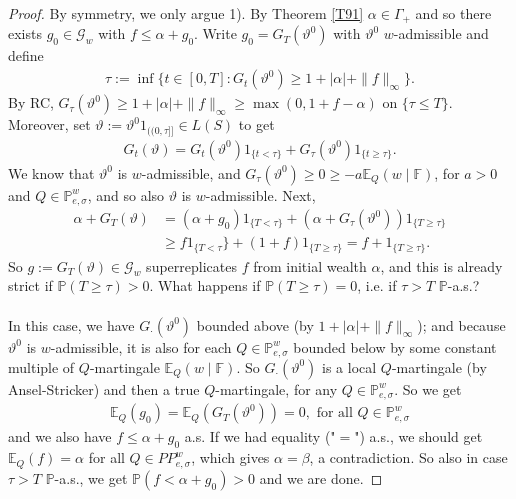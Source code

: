 \documentclass[12pt,a4paper, twoside]{article}
\theoremstyle{definition}
\newcommand{\EE}{\mathbb{E}} %
\newcommand{\PP}{\mathbb{P}} %
\begin{document}
\begin{proof}
By symmetry, we only argue 1). By Theorem \ref{T91} $\alpha \in \Gamma_+$ and so there exists $g_0 \in \mathcal{G}_w$ with $f \leq \alpha + g_0$. Write $g_0 = G_T( \vartheta^0)$ with $\vartheta^0$ $w$-admissible and define \begin{align*}
\tau := \inf \{ t \in [0,T]: G_t( \vartheta^0) \geq 1 + | \alpha | + \|f\|_\infty \}. 
\end{align*}
By RC, $G_\tau ( \vartheta^0) \geq 1 + | \alpha| + \|f\|_\infty \geq \max(0, 1 + f- \alpha)$ on $\{ \tau \leq T\}$. Moreover, set $\vartheta:= \vartheta^0 1_{(\!(0, \tau ]\!]} \in L(S)$ to get 
\begin{align*}
G_t( \vartheta) = G_t( \vartheta^0)1_{\{ t < \tau \}} + G_\tau( \vartheta^0)1_{\{ t \geq \tau \}}.
\end{align*}
We know that $\vartheta^0$ is $w$-admissible, and $G_\tau ( \vartheta^0) \geq 0 \geq -a \EE_Q(w \mid \mathbb{F})$, for $a>0$ and $Q \in \PP_{e, \sigma}^w$, and so also $\vartheta$ is $w$-admissible.  Next, 
\begin{align*}
\alpha + G_T( \vartheta) &= ( \alpha + g_0) 1_{\{ T < \tau\}} + ( \alpha + G_\tau( \vartheta^0))1_{\{ T \geq \tau\}} \\
& \geq f1_{\{ T < \tau}\} + (1+f)1_{\{ T \geq \tau\}} = f + 1_{\{ T \geq \tau\}}.
\end{align*}
So $g:= G_T( \vartheta) \in \mathcal{G}_w$ superreplicates $f$ from initial wealth $\alpha$, and this is already strict if $\PP( T \geq \tau)>0$. 
\newpage
What happens if $\PP( T \geq \tau )=0$, i.e. if $\tau > T$ $\PP$-a.s.? \\\\
In this case, we have $G_\cdot ( \vartheta^0)$ bounded above (by $1 + | \alpha| + \|f\|_\infty$); and because $\vartheta^0$ is $w$-admissible, it is also for each $Q \in \PP_{e, \sigma}^w$ bounded below by some constant multiple of $Q$-martingale $\EE_Q(w \mid \mathbb{F})$. So $G_\cdot( \vartheta^0)$ is a  local $Q$-martingale (by Ansel-Stricker) and then a true $Q$-martingale, for any $Q \in \PP_{e,  \sigma}^w$. So we get 
\begin{align*}
\EE_Q(g_0) = \EE_Q( G_T( \vartheta^0))=0, \text{ for all } Q \in \PP_{e, \sigma}^w
\end{align*}
and we also have $f \leq \alpha + g_0$ a.s. If we had equality ("$=$") a.s., we should get $\EE_Q(f)= \alpha$ for all $Q \in PP_{e, \sigma}^w$, which gives $\alpha= \beta$, a contradiction. So also in case $\tau > T$ $\PP$-a.s., we get $\PP(f < \alpha + g_0)>0$ and we are done. 
\end{proof}
\end{document}
